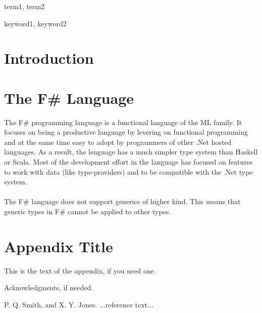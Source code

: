 \documentclass{sigplanconf}
\begin{document}
\terms
term1, term2

\keywords
keyword1, keyword2

\section{Introduction}

\section{The F\# Language}
The F\# programming language is a functional language of the ML family. It focuses on being a productive language by levering on functional programming and at the same time easy to adopt by programmers of other .Net hosted languages. As a result, the lenguage has a much simpler type system than Haskell or Scala. Most of the development effort in the language has focused on features to work with data (like type-providers) and to be compatible with the .Net type system.
\\\\
The F\# language does not support generics of higher kind. This means that generic types in F\# cannot be applied to other types.

\appendix
\section{Appendix Title}

This is the text of the appendix, if you need one.

\acks

Acknowledgments, if needed.





\begin{thebibliography}{}
\softraggedright

P. Q. Smith, and X. Y. Jones. ...reference text...

\end{thebibliography}
\end{document}
